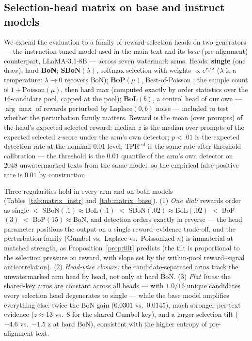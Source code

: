 \documentclass{article} %
\begin{document}
\subsection{Selection-head matrix on base and instruct models}\label{app:matrix}
We extend the evaluation to a family of reward-selection heads on two
generators --- the instruction-tuned model used in the main text and its
\emph{base} (pre-alignment) counterpart, LLaMA-3.1-8B --- across seven
watermark arms. Heads: \textbf{single} (one draw); hard \textbf{BoN};
\textbf{SBoN}$(\lambda)$, softmax selection with weights
$\propto e^{r_i/\lambda}$ \citep{verdun2025soft} ($\lambda$ is a
temperature: $\lambda\to0$ recovers BoN); \textbf{BoP}$(\mu)$,
Best-of-Poisson \citep{khalaf2025hedging}: the sample count is
$1+\mathrm{Poisson}(\mu)$, then hard max (computed exactly by order
statistics over the $16$-candidate pool, capped at the pool);
\textbf{BoL}$(b)$, a control head of our own --- $\arg\max$ of rewards
perturbed by $\mathrm{Laplace}(0,b)$ noise --- included to test whether the
perturbation family matters. Reward is the mean (over prompts) of the head's
expected selected reward; median $z$ is the median over prompts of the
expected selected z-score under the arm's own detector; $p{<}.01$ is the
expected detection rate at the nominal $0.01$ level; TPR$^{\mathrm{cal}}$ is
the same rate after threshold calibration --- the threshold is the $0.01$
quantile of the arm's own detector on $2048$ unwatermarked texts from the
same model, so the empirical false-positive rate is $0.01$ by construction.

Three regularities hold in every arm and on both models
(Tables~\ref{tab:matrix_instr} and~\ref{tab:matrix_base}).
(1) \emph{One dial:} rewards order as single
$<$ SBoN$(.1)\!\approx\!$BoL$(.1)$ $<$ SBoN$(.02)\!\approx\!$BoL$(.02)$
$<$ BoP$(3)$ $<$ BoP$(15)\!\approx\!$BoN, and detection orders exactly in
reverse --- the head parameter positions the output on a single
reward--evidence trade-off, and the perturbation family (Gumbel vs.\
Laplace vs.\ Poissonized $n$) is immaterial at matched strength, as
Proposition~\ref{prop:tilt} predicts (the tilt is proportional to the
selection pressure on reward, with slope set by the within-pool
reward--signal anticorrelation).
(2) \emph{Head-wise closure:} the candidate-separated arms track the
unwatermarked arm head by head, not only at hard BoN.
(3) \emph{Flat lines:} the shared-key arms are constant across all heads
--- with $1.0/16$ unique candidates every selection head degenerates to
single --- while the base model amplifies everything else: twice the BoN
gain ($0.0301$ vs.\ $0.0145$), much stronger per-text evidence
($z\approx13$ vs.\ $8$ for the shared Gumbel key), and a larger selection
tilt ($-4.6$ vs.\ $-1.5$ z at hard BoN), consistent with the higher entropy
of pre-alignment text.
\end{document}

